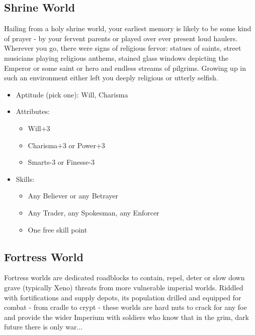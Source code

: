 \subsection{Shrine World}
Hailing from a holy shrine world, your earliest memory is likely to be some kind of prayer - by your fervent parents or played over ever present loud haulers. Wherever you go, there were signs of religious fervor: statues of saints, street musicians playing religious anthems, stained glass windows depicting the Emperor or some saint or hero and endless streams of pilgrims. Growing up in such an environment either left you deeply religious or utterly selfish.

\begin{itemize}
	\item Aptitude (pick one): Will, Charisma
	\item Attributes:
	\begin{itemize}
		\item Will+3
		\item Charisma+3 or Power+3
		\item Smarts-3 or Finesse-3
	\end{itemize}
	\item Skills: 
	\begin{itemize}
	 	\item Any Believer or any Betrayer
	 	\item Any Trader, any Spokesman, any Enforcer
	 	\item One free skill point
	 \end{itemize} 
\end{itemize}

\subsection{Fortress World}
Fortress worlds are dedicated roadblocks to contain, repel, deter or slow down grave (typically Xeno) threats from more vulnerable imperial worlds. Riddled with fortifications and supply depots, its population drilled and equipped for combat - from cradle to crypt - these worlds are hard nuts to crack for any foe and provide the wider Imperium with soldiers who know that in the grim, dark future there is only war...


